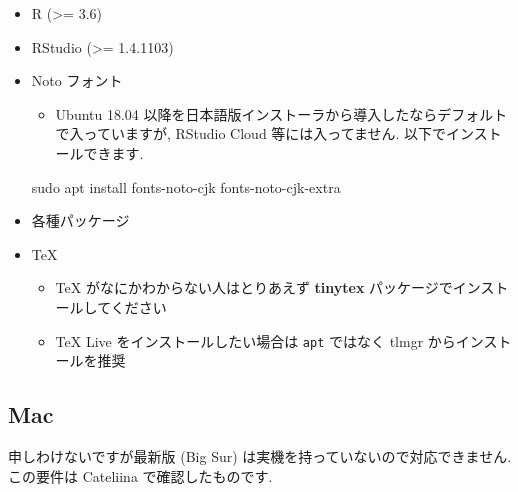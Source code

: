 \documentclass[
]{bxjsarticle}
\newenvironment{Shaded}{\begin{snugshade}}{\end{snugshade}}
\newcommand{\FunctionTok}[1]{\textcolor[rgb]{0.00,0.00,0.00}{#1}}
\newcommand{\NormalTok}[1]{#1}
\providecommand{\tightlist}{%
  \setlength{\itemsep}{0pt}\setlength{\parskip}{0pt}}
\begin{document}
\begin{itemize}
\tightlist
\item
  R (\textgreater= 3.6)
\item
  RStudio (\textgreater= 1.4.1103)
\item
  Noto フォント

  \begin{itemize}
  \tightlist
  \item
    Ubuntu 18.04 以降を日本語版インストーラから導入したならデフォルトで入っていますが, RStudio Cloud 等には入ってません. 以下でインストールできます.
  \end{itemize}

\begin{Shaded}
\begin{Highlighting}[]
\FunctionTok{sudo}\NormalTok{ apt install fonts{-}noto{-}cjk fonts{-}noto{-}cjk{-}extra}
\end{Highlighting}
\end{Shaded}
\item
  各種パッケージ
\item
  TeX

  \begin{itemize}
  \tightlist
  \item
    TeX がなにかわからない人はとりあえず \textbf{tinytex} パッケージでインストールしてください
  \item
    TeX Live をインストールしたい場合は \texttt{apt} ではなく tlmgr からインストールを推奨
  \end{itemize}
\end{itemize}

\hypertarget{mac}{%
\subsection{Mac}\label{mac}}

申しわけないですが最新版 (Big Sur) は実機を持っていないので対応できません. この要件は Cateliina で確認したものです.
\end{document}
